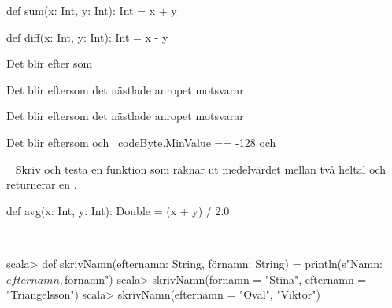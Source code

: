\Subtask {}

\Subtask {}

\Subtask {}

\Subtask {}

\SOLUTION

\TaskSolved \what

\SubtaskSolved
\begin{Code}
  def sum(x: Int, y: Int): Int = x + y
  
  def diff(x: Int, y: Int): Int = x - y
\end{Code}
  

\SubtaskSolved  Det blir  efter som  

\SubtaskSolved  Det blir  eftersom det nästlade anropet motsvarar \\

\SubtaskSolved  Det blir  eftersom det nästlade anropet motsvarar \\

\SubtaskSolved  Det blir  eftersom  och \  code{Byte.MinValue == -128} och 

\QUESTEND




\QUESTBEGIN

\Task  \what~ Skriv och testa en funktion  som räknar ut medelvärdet mellan två heltal och returnerar en .

\SOLUTION

\TaskSolved \what

\begin{Code}
def avg(x: Int, y: Int): Double = (x + y) / 2.0
\end{Code}

\QUESTEND





\QUESTBEGIN

\Task  \what~
\begin{REPL}
scala> def skrivNamn(efternamn: String, förnamn: String) =
         println(s"Namn: $efternamn, $förnamn")
scala> skrivNamn(förnamn = "Stina", efternamn = "Triangelsson")
scala> skrivNamn(efternamn = "Oval", "Viktor")

\end{REPL}

